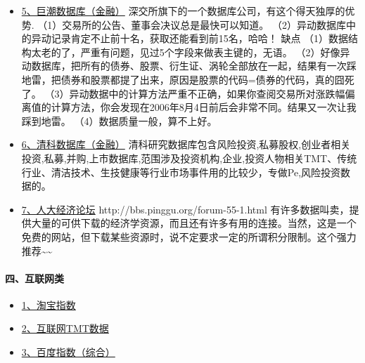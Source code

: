 \documentclass[letterpaper,10pt,english]{sphinxmanual}
\begin{document}
\begin{itemize}
\item {} 
\href{http://www.cninfo.com.cn/}{5、巨潮数据库（金融）}
深交所旗下的一个数据库公司，有这个得天独厚的优势.
（1）交易所的公告、董事会决议总是最快可以知道。
（2）异动数据库中的异动记录肯定不止前十名，获取还能看到前15名，哈哈！
缺点
（1）数据结构太老的了，严重有问题，见过5个字段来做表主键的，无语。
（2）好像异动数据库，把所有的债券、股票、衍生证、涡轮全部放在一起，结果有一次踩地雷，把债券和股票都提了出来，原因是股票的代码=债券的代码，真的囧死了。
（3）异动数据中的计算方法严重不正确，如果你查阅交易所对涨跌幅偏离值的计算方法，你会发现在2006年8月4日前后会非常不同。结果又一次让我踩到地雷。
（4）数据质量一般，算不上好。

\item {} 
\href{http://www.pedaily.cn/}{6、清科数据库（金融）}
清科研究数据库包含风险投资,私募股权,创业者相关投资,私募,并购,上市数据库,范围涉及投资机构,企业,投资人物相关TMT、传统行业、清洁技术、生技健康等行业市场事件用的比较少，专做Pe,风险投资数据的。

\item {} 
\href{http://bbs.pinggu.org/forum-5-1.html}{7、人大经济论坛}
http://bbs.pinggu.org/forum-55-1.html
有许多数据叫卖，提供大量的可供下载的经济学资源，而且还有许多有用的连接。当然，这是一个免费的网站，但下载某些资源时，说不定要求一定的所谓积分限制。这个强力推荐\textasciitilde{}\textasciitilde{}

\end{itemize}


\paragraph{四、互联网类}
\label{opendatasource:}\label{opendatasource:id10}\begin{itemize}
\item {} 
\href{http://shu.taobao.com/}{1、淘宝指数}

\item {} 
\href{http://www.199it.com/}{2、互联网TMT数据}

\item {} 
\href{http://index.baidu.com/}{3、百度指数（综合）}

\end{itemize}
\end{document}
